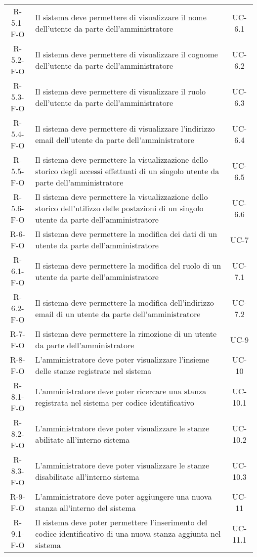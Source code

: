 \begin{longtable}{ c C{9.5cm} c }
    R-5.1-F-O & Il sistema deve permettere di visualizzare il nome dell'utente da parte dell'amministratore& UC-6.1 \\
    R-5.2-F-O & Il sistema deve permettere di visualizzare il cognome dell'utente da parte dell'amministratore& UC-6.2 \\
    R-5.3-F-O & Il sistema deve permettere di visualizzare il ruolo dell'utente da parte dell'amministratore& UC-6.3 \\
    R-5.4-F-O & Il sistema deve permettere di visualizzare l'indirizzo email dell'utente da parte dell'amministratore& UC-6.4 \\
    R-5.5-F-O & Il sistema deve permettere la visualizzazione dello storico degli accessi effettuati di un singolo utente da parte dell'amministratore& UC-6.5 \\
    R-5.6-F-O & Il sistema deve permettere la visualizzazione dello storico dell'utilizzo delle postazioni di un singolo utente da parte dell'amministratore& UC-6.6 \\
    R-6-F-O & Il sistema deve permettere la modifica dei dati di un utente da parte dell'amministratore& UC-7 \\
    R-6.1-F-O & Il sistema deve permettere la modifica del ruolo di un utente da parte dell'amministratore& UC-7.1 \\
    R-6.2-F-O & Il sistema deve permettere la modifica dell'indirizzo email di un utente da parte dell'amministratore& UC-7.2 \\
    R-7-F-O & Il sistema deve permettere la rimozione di un utente da parte dell'amministratore& UC-9 \\
    R-8-F-O & L'amministratore deve poter visualizzare l'insieme delle stanze registrate nel sistema& UC- 10\\
    R-8.1-F-O & L'amministratore deve poter ricercare una stanza registrata nel sistema per codice identificativo& UC- 10.1\\
    R-8.2-F-O & L'amministratore deve poter visualizzare le stanze abilitate all'interno sistema& UC- 10.2\\
    R-8.3-F-O & L'amministratore deve poter visualizzare le stanze disabilitate all'interno sistema& UC- 10.3\\
    R-9-F-O &  L'amministratore deve poter aggiungere una nuova stanza all'interno del sistema& UC- 11\\
    R-9.1-F-O & Il sistema deve poter permettere l'inserimento del codice identificativo di una nuova stanza aggiunta nel sistema& UC- 11.1\\

\end{longtable}
